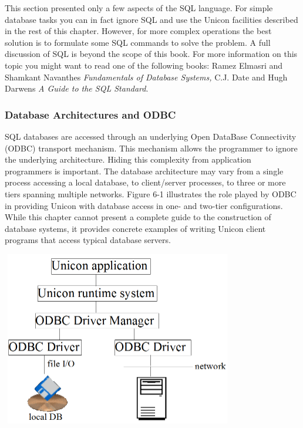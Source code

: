 
This section presented only a few aspects of the SQL language. For
simple database tasks you can in fact ignore SQL and use the Unicon
facilities described in the rest of this chapter. However, for more
complex operations the best solution is to formulate some SQL commands
to solve the problem. A full discussion of SQL is beyond the scope of
this book. For more information on this topic you might want to read
one of the following books: Ramez Elmasri and Shamkant
Navanthe{\textquotesingle}s \textit{Fundamentals of Database Systems,}
C.J. Date and Hugh Darwen{\textquotesingle}s \textit{A Guide to the SQL
Standard}.

\subsubsection[Database Architectures and ODBC]{Database Architectures
and ODBC}

SQL databases are accessed through an underlying Open
DataBase Connectivity (ODBC) transport mechanism. This mechanism allows
the programmer to ignore the underlying architecture. Hiding this
complexity from application programmers is important. The database
architecture may vary from a single process accessing a local database,
to client/server processes, to three or more tiers spanning multiple
networks. Figure 6-1 illustrates the role played by ODBC in providing
Unicon with database access in one- and two-tier configurations. While
this chapter cannot present a complete guide to the construction of
database systems, it provides concrete examples of writing Unicon
client programs that access typical database servers.

\begin{center}
\includegraphics[width=4in,height=3in]{ub-img/odbcarch.png}
\end{center}

